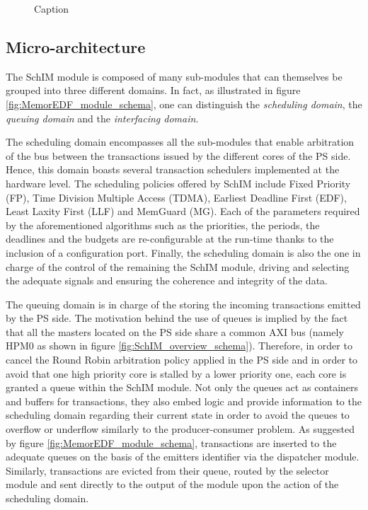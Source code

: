         \begin{figure}
            \centering
            
            \caption{Caption}
            \label{fig:SchIM_transaction_scheme_figure}
        \end{figure}

    \subsection{Micro-architecture}
        \label{subsec:micro-arch}
        The SchIM module is composed of many sub-modules that can themselves be grouped into three different domains. In fact, as illustrated in figure \ref{fig:MemorEDF_module_schema}, one can distinguish the \emph{scheduling domain}, the \emph{queuing domain} and the \emph{interfacing domain}.

        The scheduling domain encompasses all the sub-modules that enable arbitration of the bus between the transactions issued by the different cores of the PS side. Hence, this domain boasts several transaction schedulers implemented at the hardware level.
        The scheduling policies offered by SchIM include Fixed Priority (FP), Time Division Multiple Access (TDMA), Earliest Deadline First (EDF), Least Laxity First (LLF) and MemGuard (MG).
        Each of the parameters required by the aforementioned algorithms such as the priorities, the periods, the deadlines and the budgets are re-configurable at the run-time thanks to the inclusion of a configuration port.
        Finally, the scheduling domain is also the one in charge of the control of the remaining the SchIM module, driving and selecting the adequate signals and ensuring the coherence and integrity of the data.

        The queuing domain is in charge of the storing the incoming transactions emitted by the PS side.
        The motivation behind the use of queues is implied by the fact that all the masters located on the PS side share a common AXI bus (namely HPM0 as shown in figure \ref{fig:SchIM_overview_schema}).
        Therefore, in order to cancel the Round Robin arbitration policy applied in the PS side and in order to avoid that one high priority core is stalled by a lower priority one, each core is granted a queue within the SchIM module.
        Not only the queues act as containers and buffers for transactions, they also embed logic and provide information to the scheduling domain regarding their current state in order to avoid the queues to overflow or underflow similarly to the producer-consumer problem.
        As suggested by figure \ref{fig:MemorEDF_module_schema}, transactions are inserted to the adequate queues on the basis of the emitters identifier via the dispatcher module.
        Similarly, transactions are evicted from their queue, routed by the selector module and sent directly to the output of the module upon the action of the scheduling domain.

